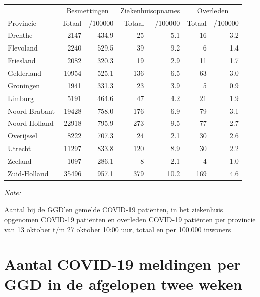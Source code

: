 \documentclass[
  english,
  man,floatsintext]{apa6}
\begin{document}
\begin{table}[H]
\centering
\begin{threeparttable}
\begin{tabular}{lrrrrrr}
\toprule
\multicolumn{1}{c}{ } & \multicolumn{2}{c}{Besmettingen} & \multicolumn{2}{c}{Ziekenhuisopnames} & \multicolumn{2}{c}{Overleden} \\
\cmidrule(l{3pt}r{3pt}){2-3} \cmidrule(l{3pt}r{3pt}){4-5} \cmidrule(l{3pt}r{3pt}){6-7}
Provincie & Totaal & /100000 & Totaal & /100000 & Totaal & /100000\\
\midrule
Drenthe & 2147 & 434.9 & 25 & 5.1 & 16 & 3.2\\
Flevoland & 2240 & 529.5 & 39 & 9.2 & 6 & 1.4\\
Friesland & 2082 & 320.3 & 19 & 2.9 & 11 & 1.7\\
Gelderland & 10954 & 525.1 & 136 & 6.5 & 63 & 3.0\\
Groningen & 1941 & 331.3 & 23 & 3.9 & 5 & 0.9\\
Limburg & 5191 & 464.6 & 47 & 4.2 & 21 & 1.9\\
Noord-Brabant & 19428 & 758.0 & 176 & 6.9 & 79 & 3.1\\
Noord-Holland & 22918 & 795.9 & 273 & 9.5 & 77 & 2.7\\
Overijssel & 8222 & 707.3 & 24 & 2.1 & 30 & 2.6\\
Utrecht & 11297 & 833.8 & 120 & 8.9 & 30 & 2.2\\
Zeeland & 1097 & 286.1 & 8 & 2.1 & 4 & 1.0\\
Zuid-Holland & 35496 & 957.1 & 379 & 10.2 & 169 & 4.6\\
\bottomrule
\end{tabular}
\begin{tablenotes}
\item \textit{Note: } 
\item Aantal bij de GGD’en gemelde COVID-19 patiënten, in het ziekenhuis opgenomen COVID-19 patiënten en overleden COVID-19 patiënten per provincie van 13 oktober t/m 27 oktober 10:00 uur, totaal en per 100.000 inwoners
\end{tablenotes}
\end{threeparttable}
\end{table}

\newpage

\hypertarget{aantal-covid-19-meldingen-per-ggd-in-de-afgelopen-twee-weken}{%
\section{Aantal COVID-19 meldingen per GGD in de afgelopen twee weken}\label{aantal-covid-19-meldingen-per-ggd-in-de-afgelopen-twee-weken}}
\end{document}
